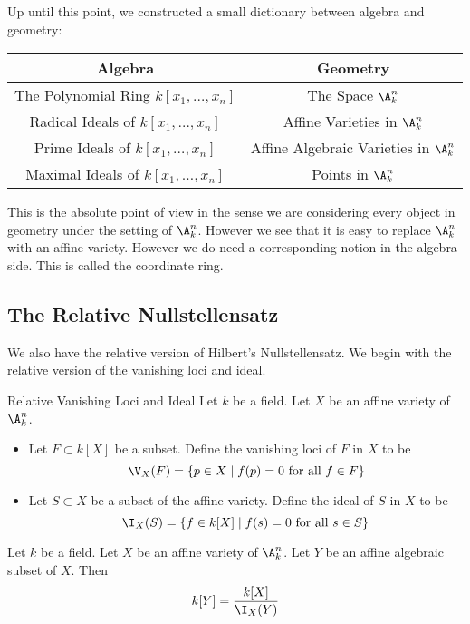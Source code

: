 \documentclass[a4paper]{article}
\begin{document}
Up until this point, we constructed a small dictionary between algebra and geometry: \\
\begin{center}\begin{tabular}{c|c}
Algebra & Geometry\\
\hline
The Polynomial Ring $k[x_1,\dots,x_n]$ & The Space $\A_k^n$\\
Radical Ideals of $k[x_1,\dots,x_n]$ & Affine Varieties in $\A_k^n$\\
Prime Ideals of $k[x_1,\dots,x_n]$ & Affine Algebraic Varieties in $\A_k^n$\\
Maximal Ideals of $k[x_1,\dots,x_n]$ & Points in $\A_k^n$
\end{tabular}\end{center}

This is the absolute point of view in the sense we are considering every object in geometry under the setting of $\A_k^n$. However we see that it is easy to replace $\A_k^n$ with an affine variety. However we do need a corresponding notion in the algebra side. This is called the coordinate ring. 

\subsection{The Relative Nullstellensatz}
We also have the relative version of Hilbert's Nullstellensatz. We begin with the relative version of the vanishing loci and ideal. 

\begin{defn}{Relative Vanishing Loci and Ideal}{} Let $k$ be a field. Let $X$ be an affine variety of $\A_k^n$. 
\begin{itemize}
\item Let $F\subset k[X]$ be a subset. Define the vanishing loci of $F$ in $X$ to be $$\V_X(F)=\{p\in X\;|\;f(p)=0\text{ for all }f\in F\}$$
\item Let $S\subset X$ be a subset of the affine variety. Define the ideal of $S$ in $X$ to be $$\I_X(S)=\{f\in k[X]\;|\;f(s)=0\text{ for all }s\in S\}$$
\end{itemize}
\end{defn}

\begin{lmm}{}{} Let $k$ be a field. Let $X$ be an affine variety of $\A_k^n$. Let $Y$ be an affine algebraic subset of $X$. Then $$k[Y]=\frac{k[X]}{\I_X(Y)}$$
\end{lmm}
\end{document}
